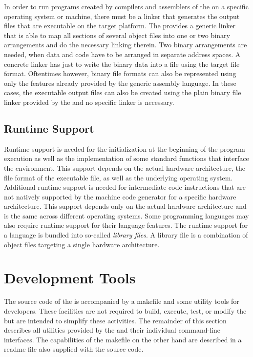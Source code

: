 In order to run programs created by compilers and assemblers of the \ecs{} on a specific operating system or machine,
there must be a linker that generates the output files that are executable on the target platform.
The \ecs{} provides a generic linker that is able to map all sections of several object files into one or two binary arrangements and do the necessary linking therein.
Two binary arrangements are needed, when data and code have to be arranged in separate address spaces.
A concrete linker has just to write the binary data into a file using the target file format.
Oftentimes however, binary file formats can also be represented using only the features already provided by the generic assembly language.
In these cases, the executable output files can also be created using the plain binary file linker provided by the \ecs{} and no specific linker is necessary.

\subsection{Runtime Support}

Runtime support is needed for the initialization at the beginning of the program execution as well as the implementation of some standard functions that interface the environment.
This support depends on the actual hardware architecture, the file format of the executable file, as well as the underlying operating system.
Additional runtime support is needed for intermediate code instructions that are not natively supported by the machine code generator for a specific hardware architecture.
This support depends only on the actual hardware architecture and is the same across different operating systems.
Some programming languages may also require runtime support for their language features.
The runtime support for a language is bundled into so-called \emph{library files}.
A library file is a combination of object files targeting a single hardware architecture.

\section{Development Tools}

The source code of the \ecs{} is accompanied by a makefile and some utility tools for developers.
These facilities are not required to build, execute, test, or modify the \ecs{} but are intended to simplify these activities.
The remainder of this section describes all utilities provided by the \ecs{} and their individual command-line interfaces.
The capabilities of the makefile on the other hand are described in a readme file also supplied with the source code.

